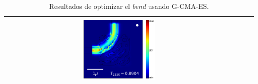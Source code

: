 \begin{table}[ht]
\begin{tabular}{|c|c|c|c|}
      \includegraphics[width=0.33\textwidth]{image/results/bend/CMA-ES/visualize_field_fab_512.png} \\
    \hline
    \end{tabular}
    \hspace*{-3cm}
    \caption{Resultados de optimizar el \emph{bend} usando G-CMA-ES.}
    \label{tab:opt-CMA-bend}
\end{table}

